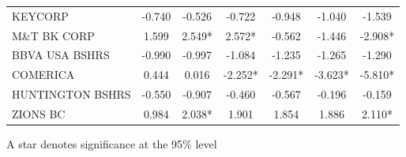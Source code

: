 \documentclass[11pt]{article}
\begin{document}
\begin{table}
\begin{tabular}{|l|c|c|c|c|c|c|}
KEYCORP               &-0.740&-0.526&-0.722&-0.948&-1.040&-1.539\\   
M\&T BK CORP          &1.599&2.549*&2.572*&-0.562&-1.446&-2.908*\\   
BBVA USA BSHRS        &-0.990&-0.997&-1.084&-1.235&-1.265&-1.290\\   
COMERICA              &0.444&0.016&-2.252*&-2.291*&-3.623*&-5.810*\\ 
HUNTINGTON BSHRS      &-0.550&-0.907&-0.460&-0.567&-0.196&-0.159\\   
ZIONS BC              &0.984&2.038*&1.901&1.854&1.886&2.110*\\       
\hline                                                               
\end{tabular}   

\flushleft
\footnotesize \noindent A star denotes significance at the 95\% level                                                      
                                                     
\end{table}                                                          
\end{document}
